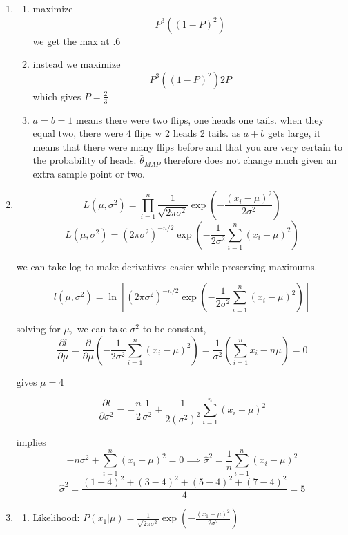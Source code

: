 \documentclass{article}
\begin{document}
\begin{enumerate}
    \item \begin{enumerate}
        \item maximize \begin{equation}
            P^3((1-P)^2)
        \end{equation}
        we get the max at .6
        \item instead we maximize \begin{equation}
            P^3((1-P)^2)2P
        \end{equation}
        which gives \(P=\frac{2}{3}\)
        \item \(a=b=1\) means there were two flips, one heads one tails. when they equal two, there were 4 flips w 2 heads 2 tails. as \(a+b\) gets large, it means that there were many flips before and that you are very certain to the probability of heads. \(\hat \theta_{MAP}\) therefore does not change much given an extra sample point or two. 
        
    \end{enumerate}
    \item $$L(\mu, \sigma^2) = \prod_{i=1}^{n} \frac{1}{\sqrt{2\pi\sigma^2}} \exp\left( -\frac{(x_i - \mu)^2}{2\sigma^2} \right)$$$$L(\mu, \sigma^2) = \left( 2\pi\sigma^2 \right)^{-n/2} \exp\left( -\frac{1}{2\sigma^2} \sum_{i=1}^{n} (x_i - \mu)^2 \right)$$
        
        we can take log to make derivatives easier while preserving maximums. 

        $$l(\mu, \sigma^2) = \ln \left[ \left( 2\pi\sigma^2 \right)^{-n/2} \exp\left( -\frac{1}{2\sigma^2} \sum_{i=1}^{n} (x_i - \mu)^2 \right) \right]$$

        solving for \(\mu,\) we can take \(\sigma^2\) to be constant,      
        $$\frac{\partial l}{\partial \mu} = \frac{\partial}{\partial \mu} \left( -\frac{1}{2\sigma^2} \sum_{i=1}^{n} (x_i - \mu)^2 \right)=\frac{1}{\sigma^2} \left( \sum_{i=1}^{n} x_i - n\mu \right) = 0$$

        gives \(\mu = 4\)

        $$\frac{\partial l}{\partial \sigma^2} = -\frac{n}{2} \frac{1}{\sigma^2} + \frac{1}{2(\sigma^2)^2} \sum_{i=1}^{n} (x_i - \mu)^2$$

        implies $$-n\sigma^2 + \sum_{i=1}^{n} (x_i - \mu)^2 = 0 \implies \hat{\sigma}^2 = \frac{1}{n} \sum_{i=1}^{n} (x_i - \mu)^2$$
        $$\hat{\sigma}^2 = \frac{(1-4)^2 + (3-4)^2 + (5-4)^2 + (7-4)^2}{4}=5$$
        \item 
        \begin{enumerate}
        \item Likelihood: $P(x_1 | \mu) = \frac{1}{\sqrt{2\pi \sigma^2}} \exp\left(-\frac{(x_1 - \mu)^2}{2\sigma^2}\right)$


\end{enumerate}
\end{enumerate}
\end{document}
